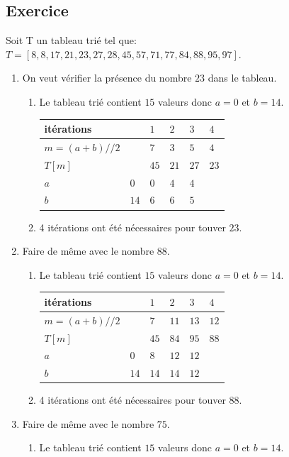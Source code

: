 \documentclass[11pt,a4paper]{article}
\newcounter{num}
\newcounter{numexo}
\begin{document}
\subsection*{\Large Exercice \thenumexo}
Soit T un tableau trié tel que: $T=[8, 8, 17, 21, 23, 27, 28, 45, 57, 71, 77, 84, 88, 95, 97]$.
\begin{enumerate}
\item On veut vérifier la présence du nombre $23$ dans le tableau.
\begin{enumerate}
\item Le tableau trié contient $15$ valeurs donc $a=0$ et $b=14$.\medskip

\begin{tabular}{|C{2.5cm}*{5}{|C{1cm}}|}\hline
itérations &&$1$&$2$&$3$&$4$\\\hline
$m=(a+b)//2$&&$7$&$3$&$5$&$4$\\\hline
$T[m]$&&$45$&$21$&$27$&$23$\\\hline
$a$&$0$&$0$&$4$&$4$&\\\hline
$b$&$14$&$6$&$6$&$5$&\\\hline
\end{tabular}\medskip


\item 4 itérations ont été nécessaires pour touver $23$.
\end{enumerate}
\item Faire de même avec le nombre $88$.
\begin{enumerate}
\item Le tableau trié contient $15$ valeurs donc $a=0$ et $b=14$.\medskip

\begin{tabular}{|C{2.5cm}*{5}{|C{1cm}}|}\hline
itérations &&$1$&$2$&$3$&$4$\\\hline
$m=(a+b)//2$&&$7$&$11$&$13$&$12$\\\hline
$T[m]$&&$45$&$84$&$95$&$88$\\\hline
$a$&$0$&$8$&$12$&$12$&\\\hline
$b$&$14$&$14$&$14$&$12$&\\\hline
\end{tabular}\medskip


\item 4 itérations ont été nécessaires pour touver $88$.
\end{enumerate}
\item Faire de même avec le nombre $75$.
\begin{enumerate}
\item Le tableau trié contient $15$ valeurs donc $a=0$ et $b=14$.\medskip


\end{enumerate}
\end{enumerate}
\end{document}
